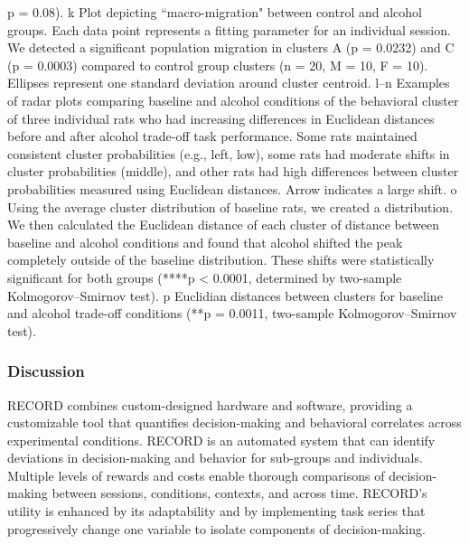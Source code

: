 \documentclass{article}
\begin{document}
\begin{singlespace}
p = 0.08). k Plot depicting “macro-migration" between control and alcohol groups. Each data point represents a fitting parameter for an individual session. We detected a significant population migration in clusters A (p = 0.0232) and C (p = 0.0003) compared to control group clusters (n = 20, M = 10, F = 10). Ellipses represent one standard deviation around cluster centroid. l–n Examples of radar plots comparing baseline and alcohol conditions of the behavioral cluster of three individual rats who had increasing differences in Euclidean distances before and after alcohol trade-off task performance. Some rats maintained consistent cluster probabilities (e.g., left, low), some rats had moderate shifts in cluster probabilities (middle), and other rats had high differences between cluster probabilities measured using Euclidean distances. Arrow indicates a large shift. o Using the average cluster distribution of baseline rats, we created a distribution. We then calculated the Euclidean distance of each cluster of distance between baseline and alcohol conditions and found that alcohol shifted the peak completely outside of the baseline distribution. These shifts were statistically significant for both groups (****p < 0.0001, determined by two-sample Kolmogorov–Smirnov test). p Euclidian distances between clusters for baseline and alcohol trade-off conditions (**p = 0.0011, two-sample Kolmogorov–Smirnov test).
\end{singlespace}


\clearpage

\subsubsection{Discussion}
RECORD combines custom-designed hardware and software, providing a customizable tool that quantifies decision-making and behavioral correlates across experimental conditions. RECORD is an automated system that can identify deviations in decision-making and behavior for sub-groups and individuals. Multiple levels of rewards and costs enable thorough comparisons of decision-making between sessions, conditions, contexts, and across time. RECORD’s utility is enhanced by its adaptability and by implementing task series that progressively change one variable to isolate components of decision-making.

\vspace{1em}
\end{document}
